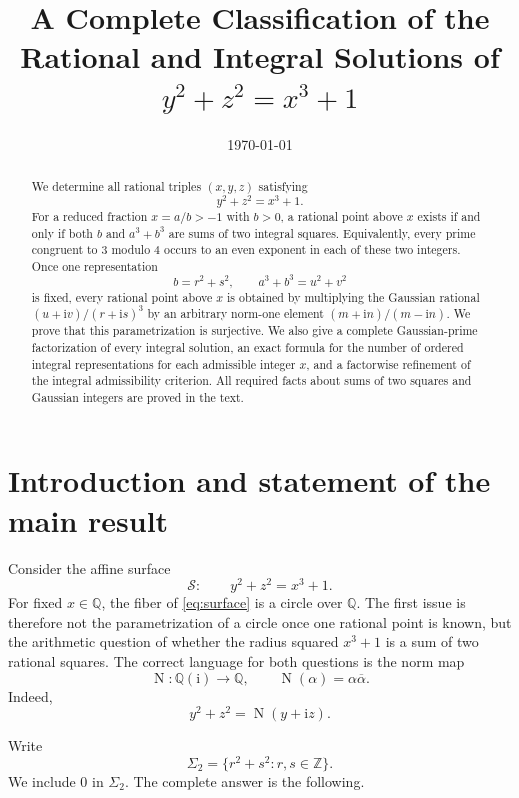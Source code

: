 \documentclass[11pt,a4paper]{article}
\title{\bfseries A Complete Classification of the Rational and Integral Solutions of
\texorpdfstring{$y^2+z^2=x^3+1$}{y2 + z2 = x3 + 1}}
\author{}
\date{\today}
\numberwithin{equation}{section}
\theoremstyle{definition}
\newcommand{\Q}{\mathbb{Q}}
\newcommand{\Z}{\mathbb{Z}}
\newcommand{\N}{\operatorname{N}}
\newcommand{\conj}[1]{\overline{#1}}
\newcommand{\ii}{\mathrm{i}}
\newcommand{\sumsq}{\Sigma_2}
\begin{document}
\maketitle

\begin{abstract}
We determine all rational triples $(x,y,z)$ satisfying
\[
 y^2+z^2=x^3+1.
\]
For a reduced fraction $x=a/b>-1$ with $b>0$, a rational point above $x$ exists if and only if both $b$ and $a^3+b^3$ are sums of two integral squares. Equivalently, every prime congruent to $3$ modulo $4$ occurs to an even exponent in each of these two integers. Once one representation
\[
 b=r^2+s^2,
 \qquad
 a^3+b^3=u^2+v^2
\]
is fixed, every rational point above $x$ is obtained by multiplying the Gaussian rational
$(u+\ii v)/(r+\ii s)^3$ by an arbitrary norm-one element
$(m+\ii n)/(m-\ii n)$. We prove that this parametrization is surjective. We also give a complete Gaussian-prime factorization of every integral solution, an exact formula for the number of ordered integral representations for each admissible integer $x$, and a factorwise refinement of the integral admissibility criterion. All required facts about sums of two squares and Gaussian integers are proved in the text.
\end{abstract}

\tableofcontents

\section{Introduction and statement of the main result}

Consider the affine surface
\begin{equation}
 \mathcal S:\qquad y^2+z^2=x^3+1.
 \label{eq:surface}
\end{equation}
For fixed $x\in\Q$, the fiber of \eqref{eq:surface} is a circle over $\Q$. The first issue is therefore not the parametrization of a circle once one rational point is known, but the arithmetic question of whether the radius squared $x^3+1$ is a sum of two rational squares. The correct language for both questions is the norm map
\[
 \N:\Q(\ii)\longrightarrow\Q,
 \qquad
 \N(\alpha)=\alpha\conj{\alpha}.
\]
Indeed,
\[
 y^2+z^2=\N(y+\ii z).
\]

Write
\[
 \sumsq=\{r^2+s^2:r,s\in\Z\}.
\]
We include $0$ in $\sumsq$. The complete answer is the following.
\end{document}
